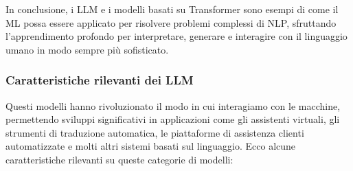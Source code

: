             In conclusione, i LLM e i modelli basati su Transformer sono esempi di come il ML possa essere applicato per risolvere problemi complessi di NLP, sfruttando l'apprendimento profondo per interpretare, generare e interagire con il linguaggio umano in modo sempre più sofisticato.
        
        \subsubsection{Caratteristiche rilevanti dei LLM}
            Questi modelli hanno rivoluzionato il modo in cui interagiamo con le macchine, permettendo sviluppi significativi in applicazioni come gli assistenti virtuali, gli strumenti di traduzione automatica, le piattaforme di assistenza clienti automatizzate e molti altri sistemi basati sul linguaggio. Ecco alcune caratteristiche rilevanti su queste categorie di modelli:

